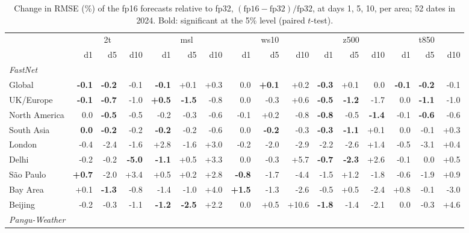 \begin{table}[tbp]
\centering
\scriptsize
\setlength{\tabcolsep}{2.5pt}
\caption{Change in RMSE (\%) of the fp16 forecasts relative to fp32, $(\mathrm{fp16}-\mathrm{fp32})/\mathrm{fp32}$, at days 1, 5, 10, per area; 52 dates in 2024. Bold: significant at the 5\% level (paired $t$-test).}
\label{tab:fp16-areas}
\begin{tabular}{lrrrrrrrrrrrrrrr}
\toprule
 & \multicolumn{3}{c}{2t} & \multicolumn{3}{c}{msl} & \multicolumn{3}{c}{ws10} & \multicolumn{3}{c}{z500} & \multicolumn{3}{c}{t850} \\
 & d1 & d5 & d10 & d1 & d5 & d10 & d1 & d5 & d10 & d1 & d5 & d10 & d1 & d5 & d10 \\
\midrule
\multicolumn{16}{l}{\textit{FastNet}} \\
Global & \textbf{-0.1} & \textbf{-0.2} & -0.1 & \textbf{-0.1} & +0.1 & +0.3 & 0.0 & \textbf{+0.1} & +0.2 & \textbf{-0.3} & +0.1 & 0.0 & \textbf{-0.1} & \textbf{-0.2} & -0.1 \\
UK/Europe & \textbf{-0.1} & \textbf{-0.7} & -1.0 & \textbf{+0.5} & \textbf{-1.5} & -0.8 & 0.0 & -0.3 & +0.6 & \textbf{-0.5} & \textbf{-1.2} & -1.7 & 0.0 & \textbf{-1.1} & -1.0 \\
North America & 0.0 & \textbf{-0.5} & -0.5 & -0.2 & -0.3 & -0.6 & -0.1 & +0.2 & -0.8 & \textbf{-0.8} & -0.5 & \textbf{-1.4} & -0.1 & \textbf{-0.6} & -0.6 \\
South Asia & \textbf{0.0} & \textbf{-0.2} & -0.2 & \textbf{-0.2} & -0.2 & -0.6 & 0.0 & \textbf{-0.2} & -0.3 & \textbf{-0.3} & \textbf{-1.1} & +0.1 & 0.0 & -0.1 & +0.3 \\
London & -0.4 & -2.4 & -1.6 & +2.8 & -1.6 & +3.0 & -0.2 & -2.0 & -2.9 & -2.2 & -2.6 & +1.4 & -0.5 & -3.1 & +0.4 \\
Delhi & -0.2 & -0.2 & \textbf{-5.0} & \textbf{-1.1} & +0.5 & +3.3 & 0.0 & -0.3 & +5.7 & \textbf{-0.7} & \textbf{-2.3} & +2.6 & -0.1 & 0.0 & +0.5 \\
São Paulo & \textbf{+0.7} & -2.0 & +3.4 & +0.5 & +0.2 & +2.8 & \textbf{-0.8} & -1.7 & -4.4 & -1.5 & +1.2 & -1.8 & -0.6 & -1.9 & +0.9 \\
Bay Area & +0.1 & \textbf{-1.3} & -0.8 & -1.4 & -1.0 & +4.0 & \textbf{+1.5} & -1.3 & -2.6 & -0.5 & +0.5 & -2.4 & +0.8 & -0.1 & -3.0 \\
Beijing & -0.2 & -0.3 & -1.1 & \textbf{-1.2} & \textbf{-2.5} & +2.2 & 0.0 & +0.5 & +10.6 & \textbf{-1.8} & -1.4 & -2.1 & 0.0 & -0.3 & +4.6 \\
\midrule
\multicolumn{16}{l}{\textit{Pangu-Weather}} \\

\end{tabular}
\end{table}
